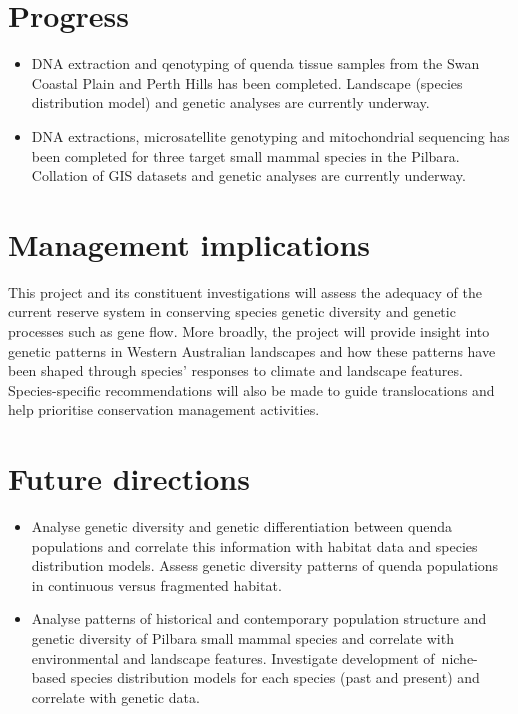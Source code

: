 \documentclass[version=last,
    paper=a4, %
    10pt, %
    usenames,
    dvipsnames,
    oneside, %
    headings=openany, %
    DIV=15 %
]{scrbook}
\begin{document}
\section*{Progress}
\begin{itemize}
\itemsep1pt\parskip0pt
\item
  DNA extraction and qenotyping of quenda tissue samples from the Swan
  Coastal Plain and Perth Hills has been completed. Landscape (species
  distribution model) and genetic analyses are currently underway.
\item
  DNA extractions, microsatellite genotyping and mitochondrial
  sequencing has been completed for three target small mammal species in
  the Pilbara. Collation of GIS datasets and genetic analyses are
  currently underway.
\end{itemize}



\section*{Management implications}
This project and its constituent investigations will assess the adequacy
of the current reserve system in conserving species genetic diversity
and genetic processes such as gene flow. More broadly, the project will
provide insight into genetic patterns in Western Australian landscapes
and how these patterns have been shaped through species' responses to
climate and landscape features. Species-specific recommendations will
also be made to guide translocations and help prioritise conservation
management activities.



\section*{Future directions}
\begin{itemize}
\itemsep1pt\parskip0pt
\item
  Analyse genetic diversity and genetic differentiation between quenda
  populations and correlate this information with habitat data and
  species distribution models. Assess genetic diversity patterns of
  quenda populations in continuous versus fragmented habitat.
\item
  Analyse patterns of historical and contemporary population structure
  and genetic diversity of Pilbara small mammal species and correlate
  with environmental and landscape features. Investigate development
  of~niche-based species distribution models for each species (past and
  present) and correlate with genetic data.
\end{itemize}



\end{document}
